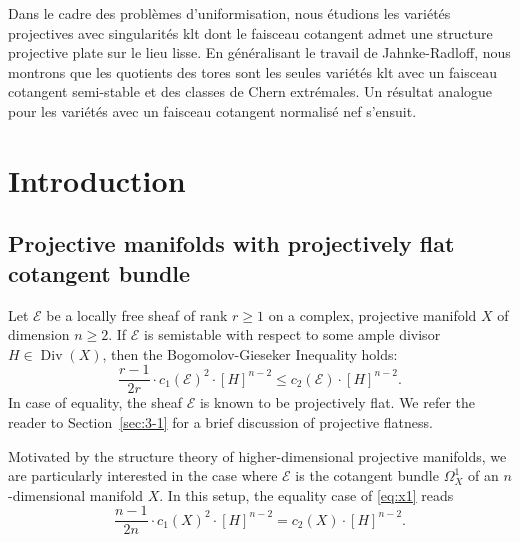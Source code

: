 \documentclass[JEP,XML,SOM,Unicode,published]{cedram}
\let\scr\mathscr
\let\vref\ref
\theoremstyle{plain}
\theoremstyle{definition}
\numberwithin{equation}{thm}
\numberwithin{enumi}{thm}
\DeclareMathOperator{\Div}{Div}
\newcommand{\sE}{\scr{E}}
\begin{document}


\begin{altabstract}
Dans le cadre des problèmes d'uniformisation, nous étudions les variétés projectives avec singularités klt dont le faisceau cotangent admet une structure projective plate sur le lieu lisse. En généralisant le travail de Jahnke-Radloff, nous montrons que les quotients des tores sont les seules variétés klt avec un faisceau cotangent semi-stable et des classes de Chern extrémales. Un résultat analogue pour les variétés avec un faisceau cotangent normalisé nef s'ensuit.
\end{altabstract}

\maketitle
\tableofcontents
\mainmatter

\section{Introduction}

\subsection{Projective manifolds with projectively flat cotangent bundle}

Let $\sE$ be a locally free sheaf of rank $r \geq 1$ on a complex, projective
manifold $X$ of dimension $n \geq 2$. If $\sE$ is semistable with respect to some
ample divisor $H \in \Div(X)$, then the Bogomolov-Gieseker Inequality holds:
\begin{equation}\label{eq:x1}
\frac{r-1}{2r}\cdot c_1(\sE)^2\cdot [H]^{n-2} \leq c_2(\sE)\cdot [H]^{n-2}.
\end{equation}
In case of equality, the sheaf $\sE$ is known to be projectively flat. We refer
the reader to Section~\vref{sec:3-1} for a brief discussion of projective
flatness.

Motivated by the structure theory of higher-dimensional projective manifolds, we
are particularly interested in the case where $\sE$ is the cotangent bundle $\Omega_X^1$
of an $n$-dimensional manifold $X$. In this setup, the equality case of
\eqref{eq:x1} reads
\begin{equation}\label{BGE}
\frac{n-1}{2n}\cdot c_1(X)^2\cdot [H]^{n-2} = c_2(X)\cdot [H]^{n-2}.
\end{equation}
\end{document}
